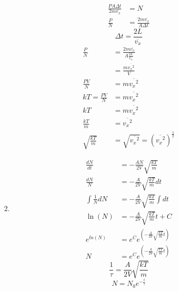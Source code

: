 \documentclass{article}
\begin{document}
\begin{enumerate}
\begin{enumerate}
\begin{align*}
                \frac{PA \Delta t}{2m \overline{v_x}} &= N \\
                \frac{P}{N} &= \frac{2m \overline{v_x}}{A \Delta t}
            \end{align*}
            \begin{equation*}
                \Delta t = \frac{2L}{\overline{v_x}}
            \end{equation*}
            \begin{align*}
                \frac{P}{N} &= \frac{2m \overline{v_x}}{A \frac{2L}{\overline{v_x}}} \\
                &= \frac{m \overline{{v_x}^2}}{V} \\
                \frac{PV}{N} &= m \overline{{v_x}^2} \\
                kT = \frac{PV}{N} &= m \overline{{v_x}^2} \\
                kT &= m \overline{{v_x}^2} \\
                \frac{kT}{m} &= \overline{{v_x}^2} \\
                \sqrt{\frac{kT}{m}} &= \sqrt{\overline{{v_x}^2}} = \left(\overline{{v_x}^2} \right)^{\frac{1}{2}}
            \end{align*}
        \vspace{0.05in}
        \item
            \begin{align*}
                \frac{dN}{dt} &= - \frac{AN}{2V} \sqrt{\frac{kT}{m}} \\
                \frac{dN}{N} &= - \frac{A}{2V} \sqrt{\frac{kT}{m}} dt \\
                \int \frac{1}{N} dN &= - \frac{A}{2V} \sqrt{\frac{kT}{m}} \int dt \\
                \ln (N) &= - \frac{A}{2V} \sqrt{\frac{kT}{m}} t + C \\
                e^{ln (N)} &= e^C e^{\left(- \frac{A}{2V} \sqrt{\frac{kT}{m}} t \right)} \\
                N &= e^C e^{\left(- \frac{A}{2V} \sqrt{\frac{kT}{m}} t \right)}
            \end{align*}
            \begin{equation*}
                \frac{1}{\tau} = \frac{A}{2V} \sqrt{\frac{kT}{m}}
            \end{equation*}
            \begin{equation*}
                N = N_0 e^{- \frac{t}{\tau}}

\end{equation*}
\end{enumerate}
\end{enumerate}
\end{document}
